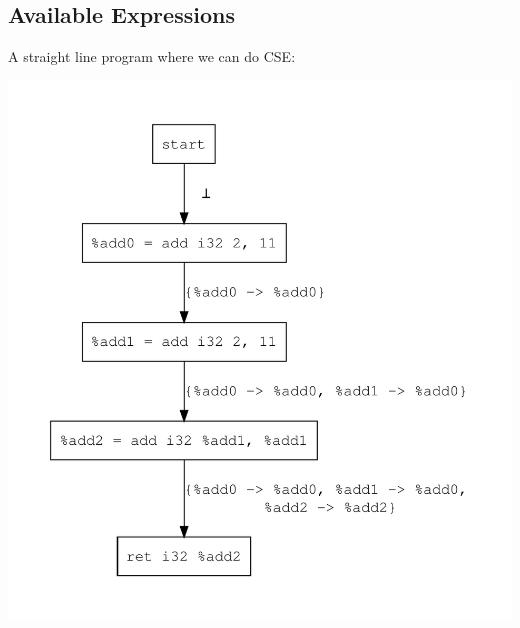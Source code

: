 \documentclass{article}
\theoremstyle{definition}
\begin{document}
\subsection{Available Expressions}
A straight line program where we can do CSE:
\begin{center}
  \includegraphics[scale=.4]{figures/cse/straight-line/can-do.pdf}
\end{center}
\end{document}
